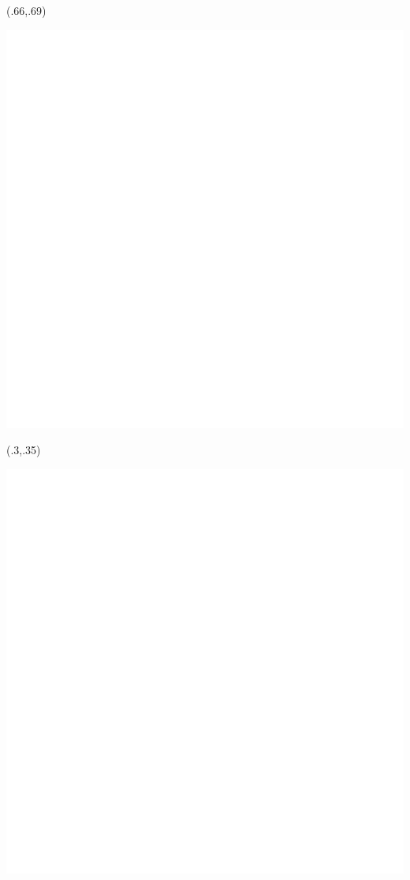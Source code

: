 \begin{textblock}{.45}(.66,.69)
	\begin{center}
		\includegraphics[width=.15\paperwidth]{images/copertina4}
	\end{center}
\end{textblock}

\begin{textblock}{.4}(.3,.35)
	\begin{center}
		\includegraphics[width=.2\paperwidth]{images/unitologo}
	\end{center}
\end{textblock}

